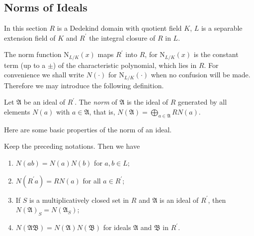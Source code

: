 \subsection{Norms of Ideals}
In this section $R$ is a Dedekind domain with quotient field $K$, $L$ is a separable extension field of $K$ and $R^\prime$ the integral closure of $R$ in $L$.\par
The norm function $\mathrm{N}_{L/K}(x)$ maps $R^\prime$ into $R$, for $\mathrm{N}_{L/K}(x)$ is the constant term (up to a $\pm$) of the characteristic polynomial, which lies in $R$. For convenience we shall write $N(\cdot)$ for $\mathrm{N}_{L/K}(\cdot)$ when no confusion will be made. Therefore we may introduce the following definition.
\begin{definition}
Let $\mathfrak{A}$ be an ideal of $R^\prime$. The \textit{norm} of $\mathfrak{A}$ is the ideal of $R$ generated by all elements $N(a)$ with $a\in\mathfrak{A}$, that is, $N(\mathfrak{A})=\bigoplus_{a\in\mathfrak{A}}RN(a)$.
\end{definition}
Here are some basic properties of the norm of an ideal.
\begin{proposition}
Keep the preceding notations. Then we have 
\begin{enumerate}
    \item $N(ab)=N(a)N(b)$ for $a,b\in L$;
    \item $N(R^\prime a)=RN(a)$ for all $a\in R^\prime$;
    \item If $S$ is a multiplicatively closed set in $R$ and $\mathfrak{A}$ is an ideal of $R^\prime$, then $N(\mathfrak{A})_S=N(\mathfrak{A}_S)$;
    \item $N(\mathfrak{AB})=N(\mathfrak{A})N(\mathfrak{B})$ for ideals $\mathfrak{A}$ and $\mathfrak{B}$ in $R^\prime$.
\end{enumerate}
\end{proposition}
